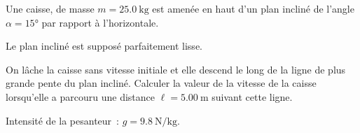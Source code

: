 
Une caisse, de masse $m=\qty{25.0}{\kg}$ est amenée en haut d'un plan incliné de
l'angle $\alpha=\ang{15}$ par rapport à l'horizontale.

Le plan incliné est supposé parfaitement lisse.

On lâche la caisse sans vitesse initiale et elle descend le long de la ligne de
plus grande pente du plan incliné. Calculer la valeur de la vitesse de la caisse
lorsqu'elle a parcouru une distance $\ell=\qty{5.00}{\m}$ suivant cette ligne.

\begin{donnees}
    Intensité de la pesanteur~: $g=\qty{9.8}{\N\per\kg}$.
\end{donnees}
